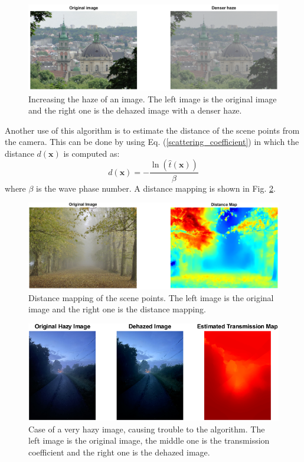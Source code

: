 \documentclass[conference]{IEEEtran}
\begin{document}
\begin{figure}
    \centering
    \includegraphics[width=\linewidth]{img/denser_haze.png}
    \caption{Increasing the haze of an image. The left image is the original image and the right one is the dehazed image with a denser haze.}
    \label{denser_haze}
\end{figure}
Another use of this algorithm is to estimate the distance of the scene points from the camera. This can be done by using Eq. (\ref{scattering_coefficient}) in which the distance $d(\mathbf{x})$ is computed as:
\begin{equation}
    d(\mathbf{x}) = -\frac{\ln(\hat{t}(\mathbf{x}))}{\beta}
\end{equation}
where $\beta$ is the wave phase number. A distance mapping is shown in Fig. \ref{distance_mapping}.
\begin{figure}
    \centering
    \includegraphics[width=\linewidth]{img/distance_mapping.png}
    \caption{Distance mapping of the scene points. The left image is the original image and the right one is the distance mapping.}
    \label{distance_mapping}
\end{figure}
\begin{figure}
    \centering
    \includegraphics[width=\linewidth]{img/validation4.png}
    \caption{Case of a very hazy image, causing trouble to the algorithm. The left image is the original image, the middle one is the transmission coefficient and the right one is the dehazed image.}
    \label{validation4}
\end{figure}
\end{document}
